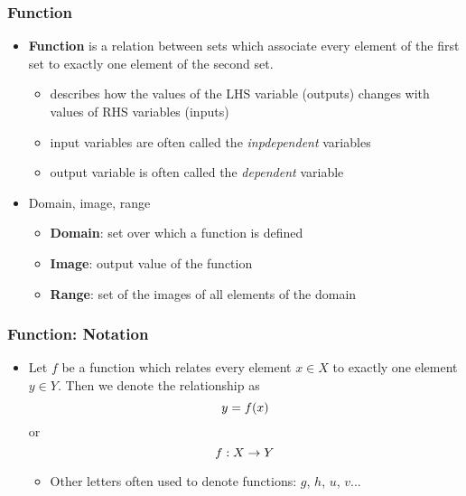 \documentclass[pdflatex, 12pt]{beamer}
\begin{document}
\begin{frame}
\frametitle{Function}
\begin{itemize}
\item \textbf{Function} is a relation between sets which associate every element of the first set to exactly one element of the second set.
 \begin{itemize}
 \item describes how the values of the LHS variable (outputs) changes with values of RHS variables (inputs)
 \item input variables are often called the \emph{inpdependent} variables
 \item output variable is often called the \emph{dependent} variable
 \end{itemize}
\vspace{0.4cm}
\item Domain, image, range
 \begin{itemize}
 \item \textbf{Domain}: set over which a function is defined
 \item \textbf{Image}: output value of the function 
 \item \textbf{Range}: set of the images of all elements of the domain
 \end{itemize}
\end{itemize}
\end{frame}

\begin{frame}
\frametitle{Function: Notation}
\begin{itemize}
\item Let $f$ be a function which relates every element $x \in X$ to exactly one element $y \in Y$. Then we denote the relationship as
\begin{equation}
y = f(x) \notag
\end{equation}
or 
\begin{equation}
f: X \rightarrow Y \notag
\end{equation}
 \begin{itemize}
 \item Other letters often used to denote functions: $g$, $h$, $u$, $v$...
 \end{itemize}
\end{itemize}
\end{frame}
\end{document}
